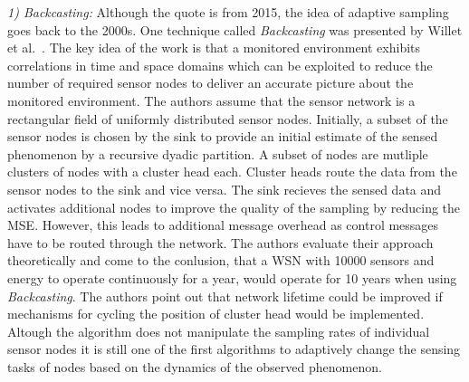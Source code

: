 \par
\textit{1) Backcasting:}
Although the quote is from 2015, the idea of adaptive sampling goes back to the
2000s. One technique called \textit{Backcasting} was presented by Willet et
al.~\cite{willett2004backcasting}. The key idea of the work is that a monitored
environment exhibits correlations in time and space domains which can be
exploited to reduce the number of required sensor nodes to deliver an accurate
picture about the monitored environment. The authors assume that the sensor
network is a rectangular field of uniformly distributed sensor nodes.
Initially, a subset of the sensor nodes is chosen by the sink to provide an
initial estimate of the sensed phenomenon by a recursive dyadic partition. A
subset of nodes are mutliple clusters of nodes with a cluster head each.
Cluster heads route the data from the sensor nodes to the sink and vice versa.
The sink recieves the sensed data and activates additional nodes to improve the
quality of the sampling by reducing the \ac{MSE}. However, this leads to
additional message overhead as control messages have to be routed through the
network. The authors evaluate their approach theoretically and come to the
conlusion, that a \ac{WSN} with 10000 sensors and energy to operate
continuously for a year, would operate for 10 years when using
\textit{Backcasting}. The authors point out that network lifetime could be
improved if mechanisms for cycling the position of cluster head would be
implemented. Altough the algorithm does not manipulate the sampling rates of
individual sensor nodes it is still one of the first algorithms to adaptively
change the sensing tasks of nodes based on the dynamics of the observed
phenomenon.

\par

